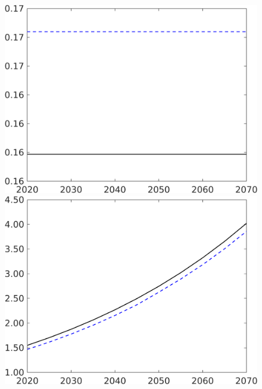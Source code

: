 \begin{figure}[h!!]
\begin{minipage}[]{0.32\textwidth}
	\end{minipage}
	\begin{minipage}[]{0.32\textwidth}
		\includegraphics[width=1\textwidth]{../../codding_model/own_basedOnFried/optimalPol_190722_tidiedUp/figures/all_10Aout22/CountTaul_modxgr_nsk_target_LgLf_spillover0_sep1_extern0_PV1_etaa0.79_lgd0.png}
	\end{minipage}
	\begin{minipage}[]{0.32\textwidth}
		\includegraphics[width=1\textwidth]{../../codding_model/own_basedOnFried/optimalPol_190722_tidiedUp/figures/all_10Aout22/CountTaul_modxgr_nsk_target_C_spillover0_sep1_extern0_PV1_etaa0.79_lgd0.png}

\end{minipage}
\end{figure}

